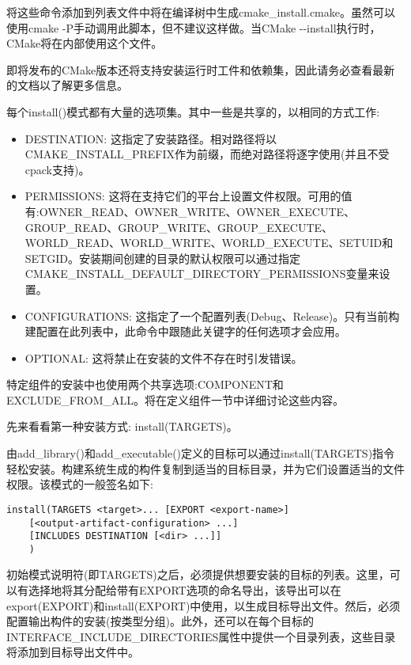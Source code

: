 将这些命令添加到列表文件中将在编译树中生成cmake\_install.cmake。虽然可以使用cmake -P手动调用此脚本，但不建议这样做。当CMake -{}-install执行时，CMake将在内部使用这个文件。

\begin{tcolorbox}[colback=blue!5!white,colframe=blue!75!black,title=Note]
即将发布的CMake版本还将支持安装运行时工件和依赖集，因此请务必查看最新的文档以了解更多信息。
\end{tcolorbox}

每个install()模式都有大量的选项集。其中一些是共享的，以相同的方式工作:

\begin{itemize}
\item 
DESTINATION: 这指定了安装路径。相对路径将以CMAKE\_INSTALL\_PREFIX作为前缀，而绝对路径将逐字使用(并且不受cpack支持)。

\item 
PERMISSIONS: 这将在支持它们的平台上设置文件权限。可用的值有:OWNER\_READ、OWNER\_WRITE、OWNER\_EXECUTE、GROUP\_READ、GROUP\_WRITE、GROUP\_EXECUTE、WORLD\_READ、WORLD\_WRITE、WORLD\_EXECUTE、SETUID和SETGID。安装期间创建的目录的默认权限可以通过指定CMAKE\_INSTALL\_DEFAULT\_DIRECTORY\_PERMISSIONS变量来设置。

\item 
CONFIGURATIONS: 这指定了一个配置列表(Debug、Release)。只有当前构建配置在此列表中，此命令中跟随此关键字的任何选项才会应用。

\item 
OPTIONAL: 这将禁止在安装的文件不存在时引发错误。
\end{itemize}

特定组件的安装中也使用两个共享选项:COMPONENT和EXCLUDE\_FROM\_ALL。将在定义组件一节中详细讨论这些内容。

先来看看第一种安装方式: install(TARGETS)。


由add\_library()和add\_executable()定义的目标可以通过install(TARGETS)指令轻松安装。构建系统生成的构件复制到适当的目标目录，并为它们设置适当的文件权限。该模式的一般签名如下:

\begin{lstlisting}[style=styleCMake]
install(TARGETS <target>... [EXPORT <export-name>]
	[<output-artifact-configuration> ...]
	[INCLUDES DESTINATION [<dir> ...]]
	)
\end{lstlisting}

初始模式说明符(即TARGETS)之后，必须提供想要安装的目标的列表。这里，可以有选择地将其分配给带有EXPORT选项的命名导出，该导出可以在export(EXPORT)和install(EXPORT)中使用，以生成目标导出文件。然后，必须配置输出构件的安装(按类型分组)。此外，还可以在每个目标的INTERFACE\_INCLUDE\_DIRECTORIES属性中提供一个目录列表，这些目录将添加到目标导出文件中。

